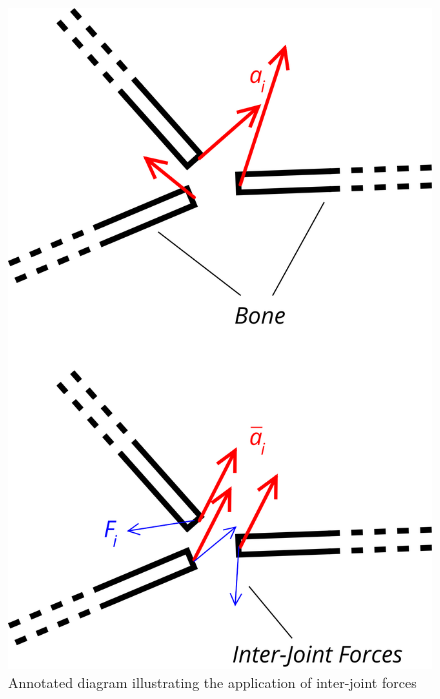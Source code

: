 \documentclass[10pt,twocolumn,letterpaper]{article}
\begin{document}
\begin{figure}[]
    \centering
    \includegraphics[width=0.7\columnwidth] {diagram2.png}
    \caption{Annotated diagram illustrating the application of inter-joint forces}
    \label{img:inter-joint}
\end{figure}
\end{document}
